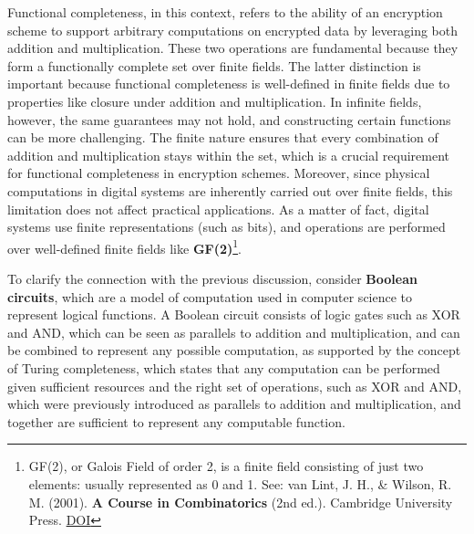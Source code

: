 \documentclass[
  letterpaper,
  DIV=11,
  numbers=noendperiod,
  oneside]{scrartcl}
\begin{document}
Functional completeness, in this context, refers to the ability of an
encryption scheme to support arbitrary computations on encrypted data by
leveraging both addition and multiplication. These two operations are
fundamental because they form a functionally complete set over finite
fields. The latter distinction is important because functional
completeness is well-defined in finite fields due to properties like
closure under addition and multiplication. In infinite fields, however,
the same guarantees may not hold, and constructing certain functions can
be more challenging. The finite nature ensures that every combination of
addition and multiplication stays within the set, which is a crucial
requirement for functional completeness in encryption schemes. Moreover,
since physical computations in digital systems are inherently carried
out over finite fields, this limitation does not affect practical
applications. As a matter of fact, digital systems use finite
representations (such as bits), and operations are performed over
well-defined finite fields like \textbf{GF(2)}\footnote{GF(2), or Galois
  Field of order 2, is a finite field consisting of just two elements:
  usually represented as 0 and 1. See: van Lint, J. H., \& Wilson, R. M.
  (2001). \textbf{A Course in Combinatorics} (2nd ed.). Cambridge
  University Press. \href{https://doi.org/10.1017/CBO9780511987045}{DOI}}.

To clarify the connection with the previous discussion, consider
\textbf{Boolean circuits}, which are a model of computation used in
computer science to represent logical functions. A Boolean circuit
consists of logic gates such as XOR and AND, which can be seen as
parallels to addition and multiplication, and can be combined to
represent any possible computation, as supported by the concept of
Turing completeness, which states that any computation can be performed
given sufficient resources and the right set of operations, such as XOR
and AND, which were previously introduced as parallels to addition and
multiplication, and together are sufficient to represent any computable
function.
\end{document}
